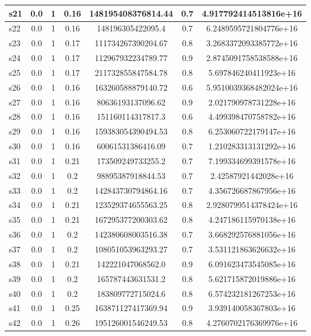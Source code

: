 \documentclass{article}
\begin{document}
\begin{tabular}{|l|c|c|c|c|c|c|}
\hline
s21 &0.0 & 1 & 0.16 & 148195408376814.44 & 0.7 & 4.917792414513816e+16\\
\hline
s22 &0.0 & 1 & 0.16 & 148196305422095.4 & 0.7 & 6.2489595721804776e+16\\
\hline
s23 &0.0 & 1 & 0.17 & 111734267390204.67 & 0.8 & 3.2683372093385772e+16\\
\hline
s24 &0.0 & 1 & 0.17 & 112967932234789.77 & 0.9 & 2.8745091758538588e+16\\
\hline
s25 &0.0 & 1 & 0.17 & 211732855847584.78 & 0.8 & 5.697846240411923e+16\\
\hline
s26 &0.0 & 1 & 0.16 & 163260588879140.72 & 0.6 & 5.9510039368482024e+16\\
\hline
s27 &0.0 & 1 & 0.16 & 80636193137096.62 & 0.9 & 2.021790978731228e+16\\
\hline
s28 &0.0 & 1 & 0.16 & 151160114317817.3 & 0.6 & 4.499398470758782e+16\\
\hline
s29 &0.0 & 1 & 0.16 & 159383054390494.53 & 0.8 & 6.253060722179147e+16\\
\hline
s30 &0.0 & 1 & 0.16 & 60061531386416.09 & 0.7 & 1.210283313131292e+16\\
\hline
s31 &0.0 & 1 & 0.21 & 173509249733255.2 & 0.7 & 7.199334699391578e+16\\
\hline
s32 &0.0 & 1 & 0.2 & 98895387918844.53 & 0.7 & 2.42587921442028e+16\\
\hline
s33 &0.0 & 1 & 0.2 & 142843730794864.16 & 0.7 & 4.356726687867956e+16\\
\hline
s34 &0.0 & 1 & 0.21 & 123529374655563.25 & 0.8 & 2.9280799514378424e+16\\
\hline
s35 &0.0 & 1 & 0.21 & 167295377200303.62 & 0.8 & 4.247186115970138e+16\\
\hline
s36 &0.0 & 1 & 0.2 & 142380608003516.38 & 0.7 & 3.668292576881056e+16\\
\hline
s37 &0.0 & 1 & 0.2 & 108051053963293.27 & 0.7 & 3.531121863626632e+16\\
\hline
s38 &0.0 & 1 & 0.21 & 142221047068562.0 & 0.9 & 6.091623473545085e+16\\
\hline
s39 &0.0 & 1 & 0.2 & 165787443631531.2 & 0.8 & 5.621715872019886e+16\\
\hline
s40 &0.0 & 1 & 0.2 & 183809772715024.6 & 0.8 & 6.574232181267253e+16\\
\hline
s41 &0.0 & 1 & 0.25 & 163871127417369.94 & 0.9 & 3.939140058367803e+16\\
\hline
s42 &0.0 & 1 & 0.26 & 195126001546249.53 & 0.8 & 4.2760702176369976e+16\\

\end{tabular}
\end{document}
